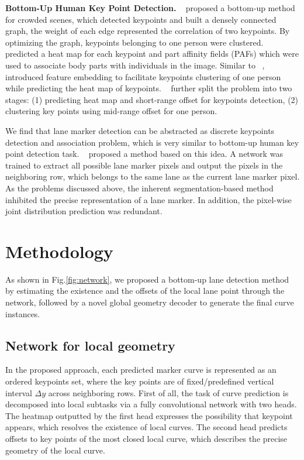 \documentclass[final]{cvpr}
\begin{document}
\textbf{Bottom-Up Human Key Point Detection.} ~\cite{pishchulin2016deepcut} proposed a bottom-up method for crowded scenes, which detected keypoints and built a densely connected graph, the weight of each edge represented the correlation of two keypoints. By optimizing the graph, keypoints belonging to one person were clustered. ~\cite{cao2017realtime} predicted a heat map for each keypoint and part affinity fields (PAFs) which were used to associate body parts with individuals in the image. Similar to ~\cite{efrat2020semi, neven2018towards}, ~\cite{newell2017associative} introduced feature embedding to facilitate keypoints clustering of one person while predicting the heat map of keypoints. ~\cite{papandreou2018personlab} further split the problem into two stages: (1) predicting heat map and short-range offset for keypoints detection, (2) clustering key points using mid-range offset for one person.

We find that lane marker detection can be abstracted as discrete keypoints detection and association problem, which is very similar to bottom-up human key point detection task. ~\cite{philion2019fastdraw} proposed a method based on this idea. A network was trained to extract all possible lane marker pixels and output the pixels in the neighboring row, which belongs to the same lane as the current lane marker pixel. As the problems discussed above, the inherent segmentation-based method inhibited the precise representation of a lane marker. In addition, the pixel-wise joint distribution prediction was redundant.
\thispagestyle{empty}
\section{Methodology}
As shown in Fig.\ref{fig:network}, we proposed a bottom-up lane detection method by estimating the existence and the offsets of the local lane point through the network, followed by a novel global geometry decoder to generate the final curve instances.

\subsection{Network for local geometry}
In the proposed approach, each predicted marker curve is represented as an ordered keypoints set, where the key points are of fixed/predefined vertical interval $\Delta y$ across neighboring rows. First of all, the task of curve prediction is decomposed into local subtasks via a fully convolutional network with two heads. The heatmap outputted by the first head expresses the possibility that keypoint appears, which resolves the existence of local curves. The second head predicts offsets to key points of the most closed local curve, which describes the precise geometry of the local curve.
\end{document}
